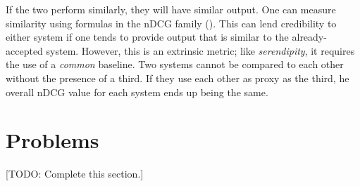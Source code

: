 If the two perform similarly, they will have similar output. One can measure similarity using formulas in the nDCG family (\citealp{Wang:2006:TOT:1150402.1150450}). This can lend credibility to either system if one tends to provide output that is similar to the already-accepted system. However, this is an extrinsic metric; like \emph{serendipity}, it requires the use of a \textit{common} baseline. Two systems cannot be compared to each other without the presence of a third. If they use each other as proxy as the third, he overall nDCG value for each system ends up being the same.


\section{Problems}

[TODO: Complete this section.]
